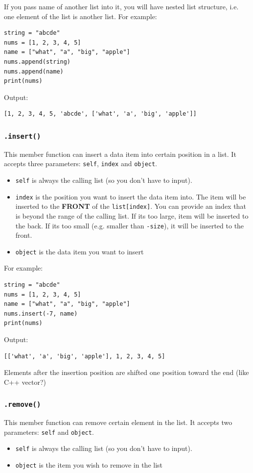 \documentclass[12pt]{book}
\begin{document}
If you pass name of another list into it, you will have nested list structure, i.e. one element of the list is another list. For example:
\begin{verbatim}
string = "abcde"
nums = [1, 2, 3, 4, 5]
name = ["what", "a", "big", "apple"]
nums.append(string)
nums.append(name)
print(nums)
\end{verbatim}
Output:
\begin{verbatim}
[1, 2, 3, 4, 5, 'abcde', ['what', 'a', 'big', 'apple']]
\end{verbatim}
\subsubsection{\texttt{.insert()}}
\label{sec:orgf3c32e8}
This member function can insert a data item into certain position in a list. It accepts three parameters: \texttt{self}, \texttt{index} and \texttt{object}.
\begin{itemize}
\item \texttt{self} is always the calling list (so you don't have to input).
\item \texttt{index} is the position you want to insert the data item into. The item will be inserted to the \textbf{FRONT} of the \texttt{list[index]}. You can provide an index that is beyond the range of the calling list. If its too large, item will be inserted to the back. If its too small (e.g. smaller than \texttt{-size}), it will be inserted to the front.
\item \texttt{object} is the data item you want to insert
\end{itemize}

For example:
\begin{verbatim}
string = "abcde"
nums = [1, 2, 3, 4, 5]
name = ["what", "a", "big", "apple"]
nums.insert(-7, name)
print(nums)
\end{verbatim}
Output:
\begin{verbatim}
[['what', 'a', 'big', 'apple'], 1, 2, 3, 4, 5]
\end{verbatim}

Elements after the insertion position are shifted one position toward the end (like C++ vector?)
\subsubsection{\texttt{.remove()}}
\label{sec:orge585cb1}
This member function can remove certain element in the list. It accepts two parameters: \texttt{self} and \texttt{object}.
\begin{itemize}
\item \texttt{self} is always the calling list (so you don't have to input).
\item \texttt{object} is the item you wish to remove in the list
\end{itemize}
\end{document}
